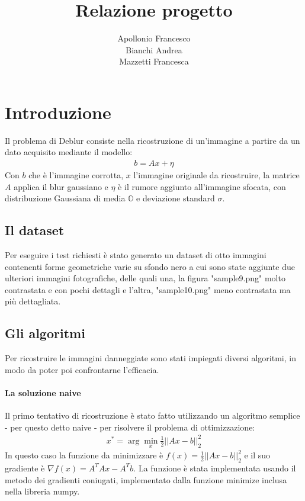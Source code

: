 \documentclass[12pt]{article}
\title{Relazione progetto}
\author{Apollonio Francesco\\Bianchi Andrea\\Mazzetti Francesca}
\begin{document}
\begin{titlepage}
\maketitle
{}
\end{titlepage}
\newpage
\tableofcontents
\newpage
{}

\section{Introduzione}

    Il problema di Deblur consiste nella ricostruzione di un'immagine a partire da un dato acquisito mediante il modello:
    \begin{align*}
        b = Ax + \eta
    \end{align*}
    Con $b$ che è l'immagine corrotta, $x$ l'immagine originale da ricostruire, la matrice $A$ applica il blur gaussiano e $\eta$ è il rumore aggiunto all'immagine sfocata, con distribuzione Gaussiana di media $\mathbb{O}$ e deviazione standard $\sigma$.
    
    \subsection{Il dataset}
    Per eseguire i test richiesti è stato generato un dataset di otto immagini contenenti forme geometriche varie su sfondo nero a cui sono state aggiunte due ulteriori immagini fotografiche, delle quali una, la figura "sample9.png" molto contrastata e con pochi dettagli e l'altra, "sample10.png" meno contrastata ma più dettagliata.
    
    \subsection{Gli algoritmi}
    Per ricostruire le immagini danneggiate sono stati impiegati diversi algoritmi, in modo da poter poi confrontarne l'efficacia.
    
    \paragraph{La soluzione naive}
    Il primo tentativo di ricostruzione è stato fatto utilizzando un algoritmo semplice - per questo detto naive - per risolvere il problema di ottimizzazione:
    \begin{align*}
        x^* = \arg\min_x \frac{1}{2} ||Ax - b||_2^2
    \end{align*}
    In questo caso la funzione da minimizzare è $f(x) = \frac{1}{2} ||Ax - b||_2^2$ e il suo gradiente è $\nabla f(x) = A^TAx - A^Tb$. La funzione è stata implementata usando il metodo dei gradienti coniugati, implementato dalla funzione minimize inclusa nella libreria numpy.
    
\end{document}
